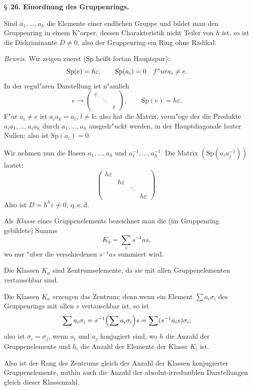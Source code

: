 \documentclass[12pt,a4paper]{article}
\theoremstyle{plain}
\newcommand{\Sp}{\mathrm{Sp}}
\begin{document}
\newpage
\S~\textbf{26.}
\textbf{Einordnung des Gruppenrings.}

\smallskip

\noindent
Sind $a_1,\ldots,a_h$ die Elemente einer endlichen Gruppe und bildet man den Gruppenring in einem K"orper, dessen Charakteristik nicht Teiler von $h$ ist, so ist die Diskriminante $D \neq 0$, also der Gruppenring ein Ring ohne Radikal.

\noindent\textit{Beweis.}
Wir zeigen zuerst ($\Sp$ hei\ss t fortan Hauptspur):
\[
\Sp(e) = h\varepsilon;\qquad \Sp(a_i) = 0 \quad{f"ur } a_i \neq e.
\]
In der regul"aren Darstellung ist n"amlich
\[
e \to \begin{pmatrix} \varepsilon & & \\ & \ddots & \\ & & \varepsilon \end{pmatrix},
\qquad
\Sp(e) = h\varepsilon.
\]
F"ur $a_i \neq e$ ist $a_i a_k = a_l$, $l \neq k$; also hat die Matrix, verm"oge der die Produkte $a_i a_1,\ldots,a_i a_h$ durch $a_1,\ldots,a_h$ ausgedr"uckt werden, in der Hauptdiagonale lauter Nullen; also ist $\Sp(a_i) = 0$.

Wir nehmen nun die Basen $a_1,\ldots,a_h$ und $a_1^{-1},\ldots,a_h^{-1}$. Die Matrix $(\Sp(a_i a_j^{-1}))$ lautet:
\[
\begin{pmatrix}
h\varepsilon & & & \\
& h\varepsilon & & \\
& & \ddots & \\
& & & h\varepsilon
\end{pmatrix}.
\]
Also ist $D = h^h \varepsilon \neq 0$, q.\,e.\,d.

Als \textit{Klasse} eines Gruppenelements bezeichnet man die (im Gruppenring gebildete) Summe
\[
K_a = \sum_s s^{-1} a s,\tag{1}
\]
wo nur "uber die verschiedenen $s^{-1} a s$ summiert wird.

Die Klassen $K_a$ sind Zentrumselemente, da sie mit allen Gruppenelementen vertauschbar sind.

Die Klassen $K_a$ erzeugen das Zentrum; denn wenn ein Element $\sum a_i \sigma_i$ des Gruppenrings mit allen $s$ vertauschbar ist, so ist
\[
\sum a_i \sigma_i = s^{-1}\Bigl(\sum a_i \sigma_i\Bigr)s = \sum (s^{-1} a_i s) \sigma_i;
\]
also ist $\sigma_i = \sigma_j$, wenn $a_i$ und $a_j$ konjugiert sind, wo $h$ die Anzahl der Gruppenelemente und $h_i$ die Anzahl der Elemente der Klasse $K_i$ ist.

Also ist der Rang des Zentrums gleich der Anzahl der Klassen konjugierter Gruppenelemente, mithin auch die Anzahl der absolut-irreduziblen Darstellungen gleich dieser Klassenzahl.
\end{document}
